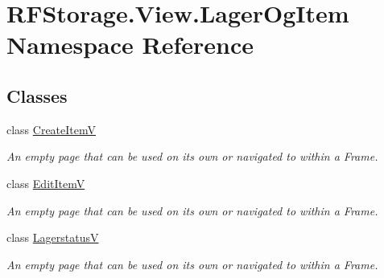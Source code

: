 \hypertarget{namespace_r_f_storage_1_1_view_1_1_lager_og_item}{}\section{R\+F\+Storage.\+View.\+Lager\+Og\+Item Namespace Reference}
\label{namespace_r_f_storage_1_1_view_1_1_lager_og_item}
\subsection*{Classes}
\begin{DoxyCompactItemize}
\item 
class \mbox{\hyperlink{class_r_f_storage_1_1_view_1_1_lager_og_item_1_1_create_item_v}{Create\+ItemV}}
\begin{DoxyCompactList}\small\item\em An empty page that can be used on its own or navigated to within a Frame. \end{DoxyCompactList}\item 
class \mbox{\hyperlink{class_r_f_storage_1_1_view_1_1_lager_og_item_1_1_edit_item_v}{Edit\+ItemV}}
\begin{DoxyCompactList}\small\item\em An empty page that can be used on its own or navigated to within a Frame. \end{DoxyCompactList}\item 
class \mbox{\hyperlink{class_r_f_storage_1_1_view_1_1_lager_og_item_1_1_lagerstatus_v}{LagerstatusV}}
\begin{DoxyCompactList}\small\item\em An empty page that can be used on its own or navigated to within a Frame. \end{DoxyCompactList}\end{DoxyCompactItemize}
